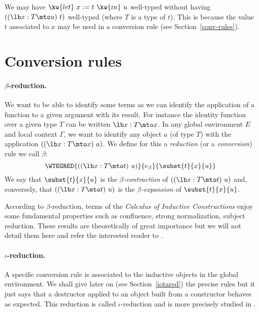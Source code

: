 \Rem We may have $\kw{let}~x:=t~\kw{in}~u$
well-typed without having $((\lb x:T\mto u)~t)$ well-typed (where
$T$ is a type of $t$). This is because the value $t$ associated to $x$
may be used in a conversion rule (see Section~\ref{conv-rules}).

\section[Conversion rules]{Conversion rules
\label{conv-rules}}
\paragraph[$\beta$-reduction.]{$\beta$-reduction.\label{beta}}

We want to be able to identify some terms as we can identify the
application of a function to a given argument with its result. For
instance the identity function over a given type $T$ can be written
$\lb x:T\mto x$. In any global environment $E$ and local context $\Gamma$, we want to identify any object $a$ (of type $T$) with the
application $((\lb x:T\mto x)~a)$. We define for this a {\em reduction} (or a
{\em conversion}) rule we call $\beta$:
\[ \WTEGRED{((\lb x:T\mto
  t)~u)}{\triangleright_{\beta}}{\subst{t}{x}{u}} \] 
We say that $\subst{t}{x}{u}$ is the {\em $\beta$-contraction} of
$((\lb x:T\mto t)~u)$ and, conversely, that $((\lb x:T\mto t)~u)$
is the {\em $\beta$-expansion} of $\subst{t}{x}{u}$.

According to $\beta$-reduction, terms of the {\em Calculus of
  Inductive Constructions} enjoy some fundamental properties such as
confluence, strong normalization, subject reduction. These results are
theoretically of great importance but we will not detail them here and
refer the interested reader to \cite{Coq85}.

\paragraph[$\iota$-reduction.]{$\iota$-reduction.\label{iota}}
A specific conversion rule is associated to the inductive objects in
the global environment.  We shall give later on (see Section~\ref{iotared}) the
precise rules but it just says that a destructor applied to an object
built from a constructor behaves as expected.  This reduction is
called $\iota$-reduction and is more precisely studied in
\cite{Moh93,Wer94}.


